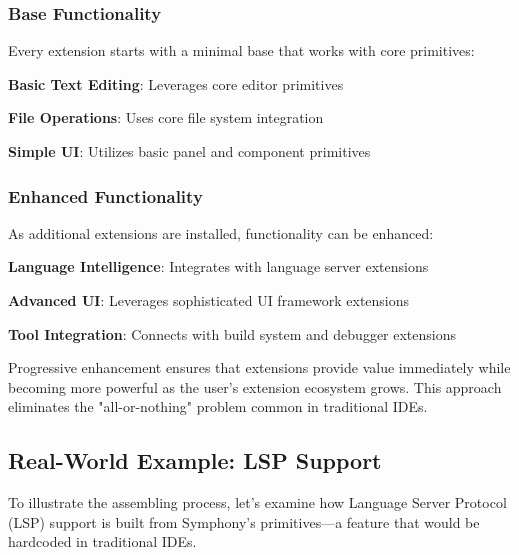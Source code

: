 \subsubsection*{Base Functionality}

Every extension starts with a minimal base that works with core primitives:

\begin{compactlist}
    \item \textbf{Basic Text Editing}: Leverages core editor primitives
    \item \textbf{File Operations}: Uses core file system integration
    \item \textbf{Simple UI}: Utilizes basic panel and component primitives
\end{compactlist}

\subsubsection*{Enhanced Functionality}

As additional extensions are installed, functionality can be enhanced:

\begin{compactlist}
    \item \textbf{Language Intelligence}: Integrates with language server extensions
    \item \textbf{Advanced UI}: Leverages sophisticated UI framework extensions
    \item \textbf{Tool Integration}: Connects with build system and debugger extensions
\end{compactlist}

\begin{successbox}
Progressive enhancement ensures that extensions provide value immediately while becoming more powerful as the user's extension ecosystem grows. This approach eliminates the "all-or-nothing" problem common in traditional IDEs.
\end{successbox}

\subsection*{Real-World Example: LSP Support}

To illustrate the assembling process, let's examine how Language Server Protocol (LSP) support is built from Symphony's primitives—a feature that would be hardcoded in traditional IDEs.

